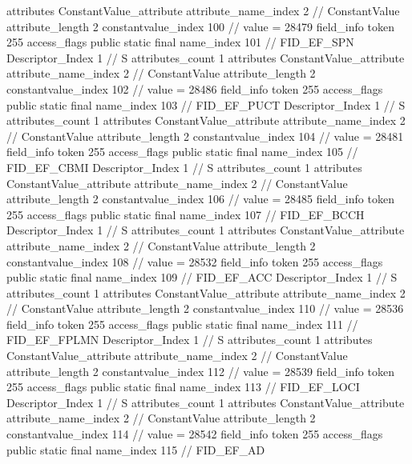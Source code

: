 {{{{{				attributes {
				ConstantValue_attribute {
					attribute_name_index	2		// ConstantValue
					attribute_length	2
					constantvalue_index	100		// value = 28479
				}
				}
			}
			field_info {
				token	255
				access_flags	public static final
				name_index	101		// FID_EF_SPN
				Descriptor_Index	1		// S
				attributes_count	1
				attributes {
				ConstantValue_attribute {
					attribute_name_index	2		// ConstantValue
					attribute_length	2
					constantvalue_index	102		// value = 28486
				}
				}
			}
			field_info {
				token	255
				access_flags	public static final
				name_index	103		// FID_EF_PUCT
				Descriptor_Index	1		// S
				attributes_count	1
				attributes {
				ConstantValue_attribute {
					attribute_name_index	2		// ConstantValue
					attribute_length	2
					constantvalue_index	104		// value = 28481
				}
				}
			}
			field_info {
				token	255
				access_flags	public static final
				name_index	105		// FID_EF_CBMI
				Descriptor_Index	1		// S
				attributes_count	1
				attributes {
				ConstantValue_attribute {
					attribute_name_index	2		// ConstantValue
					attribute_length	2
					constantvalue_index	106		// value = 28485
				}
				}
			}
			field_info {
				token	255
				access_flags	public static final
				name_index	107		// FID_EF_BCCH
				Descriptor_Index	1		// S
				attributes_count	1
				attributes {
				ConstantValue_attribute {
					attribute_name_index	2		// ConstantValue
					attribute_length	2
					constantvalue_index	108		// value = 28532
				}
				}
			}
			field_info {
				token	255
				access_flags	public static final
				name_index	109		// FID_EF_ACC
				Descriptor_Index	1		// S
				attributes_count	1
				attributes {
				ConstantValue_attribute {
					attribute_name_index	2		// ConstantValue
					attribute_length	2
					constantvalue_index	110		// value = 28536
				}
				}
			}
			field_info {
				token	255
				access_flags	public static final
				name_index	111		// FID_EF_FPLMN
				Descriptor_Index	1		// S
				attributes_count	1
				attributes {
				ConstantValue_attribute {
					attribute_name_index	2		// ConstantValue
					attribute_length	2
					constantvalue_index	112		// value = 28539
				}
				}
			}
			field_info {
				token	255
				access_flags	public static final
				name_index	113		// FID_EF_LOCI
				Descriptor_Index	1		// S
				attributes_count	1
				attributes {
				ConstantValue_attribute {
					attribute_name_index	2		// ConstantValue
					attribute_length	2
					constantvalue_index	114		// value = 28542
				}
				}
			}
			field_info {
				token	255
				access_flags	public static final
				name_index	115		// FID_EF_AD
}}}}}
